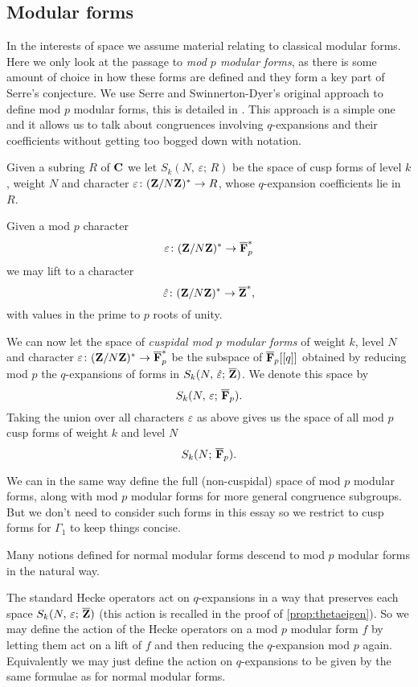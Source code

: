 \documentclass[a4paper,12pt]{article}
\begin{document}
\subsection{Modular forms}
In the interests of space we assume material relating to classical modular forms.
Here we only look at the passage to \emph{mod $p$ modular forms}, as there is some amount of choice in how these forms are defined and they form a key part of Serre's conjecture.
We use Serre and Swinnerton-Dyer's original approach to define mod $p$ modular forms, this is detailed in \cite{SD,Serre73,Serre73Formes}.
This approach is a simple one and it allows us to talk about congruences involving $q$-expansions and their coefficients without getting too bogged down with notation.

\begin{defn}
Given a subring $R$ of $\mathbf{C}$ we let $S_k(N,\,\varepsilon;\,R)$ be the space of cusp forms of level $k$, weight $N$ and character $\varepsilon\colon (\mathbf{Z}/N\mathbf{Z})^* \to R$, whose $q$-expansion coefficients lie in $R$.

Given a mod $p$ character
\[
\varepsilon\colon (\mathbf{Z}/N\mathbf{Z})^* \to \overline{\mathbf{F}}_p^*
\]
we may lift to a character %
\[
\hat{\varepsilon}\colon (\mathbf{Z}/N\mathbf{Z})^* \to \overline{\mathbf{Z}}^*,
\]
with values in the prime to $p$ roots of unity.

We can now let the space of \emph{cuspidal mod $p$ modular forms} of weight $k$, level $N$ and character $\varepsilon\colon (\mathbf{Z}/N\mathbf{Z})^* \to \overline{\mathbf{F}}_p^*$ be the subspace of $\overline{\mathbf{F}}_p[[q]]$ obtained by reducing mod $p$ the $q$-expansions of forms in $S_k(N,\,\hat{\varepsilon};\,\overline{\mathbf{Z}})$.
We denote this space by
\[
S_k(N,\,\varepsilon;\,\overline{\mathbf{F}}_p).
\]
Taking the union over all characters $\varepsilon$ as above gives us the space of all mod $p$ cusp forms of weight $k$ and level $N$
\[
S_k(N;\,\overline{\mathbf{F}}_p).
\]

We can in the same way define the full (non-cuspidal) space of mod $p$ modular forms, along with mod $p$ modular forms for more general congruence subgroups.
But we don't need to consider such forms in this essay so we restrict to cusp forms for $\Gamma_1$ to keep things concise.
\end{defn}

Many notions defined for normal modular forms descend to mod $p$ modular forms in the natural way.

\begin{defn}
The standard Hecke operators act on $q$-expansions in a way that preserves each space $S_k(N,\,\varepsilon;\,\overline{\mathbf{Z}})$ (this action is recalled in the proof of \cref{prop:thetaeigen}).
So we may define the action of the Hecke operators on a mod $p$ modular form $f$ by letting them act on a lift of $f$ and then reducing the $q$-expansion mod $p$ again.
Equivalently we may just define the action on $q$-expansions to be given by the same formulae as for normal modular forms.
\end{defn}
\end{document}
